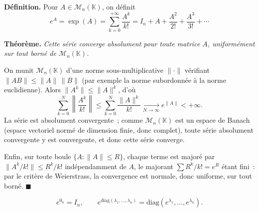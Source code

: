 ﻿%



\begin{tcolorbox}[thmbox]
  \textbf{Définition.}\enspace%
  Pour $A \in \mathcal{M}_n(\mathbb{K})$, on définit
  \[
    e^A = \exp(A) = \sum_{k=0}^{+\infty} \frac{A^k}{k!}
    = I_n + A + \frac{A^2}{2!} + \frac{A^3}{3!} + \cdots
  \]

  \textbf{Théorème.}\enspace%
  \textit{Cette série converge absolument pour toute matrice $A$,
  uniformément sur tout borné de $\mathcal{M}_n(\mathbb{K})$.}
\end{tcolorbox}


\begin{mdframed}[style=proofbar]
  On munit $\mathcal{M}_n(\mathbb{K})$ d'une norme sous-multiplicative $\|\cdot\|$
  vérifiant $\|AB\|\leq\|A\|\,\|B\|$ (par exemple la norme subordonnée à la norme
  euclidienne). Alors $\|A^k\|\leq\|A\|^k$, d'où
  \[
    \sum_{k=0}^{N}\left\|\frac{A^k}{k!}\right\| \leq \sum_{k=0}^{N}\frac{\|A\|^k}{k!}
    \xrightarrow[N\to\infty]{} e^{\|A\|} < +\infty.
  \]
  La série est absolument convergente~; comme $\mathcal{M}_n(\mathbb{K})$ est
  un espace de Banach (espace vectoriel normé de dimension finie, donc complet),
  toute série absolument convergente y est convergente, et donc cette série
  converge.

  Enfin, sur toute boule $\{A : \|A\|\leq R\}$, chaque terme est majoré par
  $\|A^k/k!\|\leq R^k/k!$ indépendamment de $A$, le majorant $\sum R^k/k! = e^R$
  étant fini~: par le critère de Weierstrass, la convergence est normale, donc
  uniforme, sur tout borné. $\blacksquare$
\end{mdframed}

\[
  e^{0_n} = I_n, \qquad
  e^{\mathrm{diag}(\lambda_1,\ldots,\lambda_n)} = \mathrm{diag}(e^{\lambda_1},\ldots,e^{\lambda_n}).
\]

